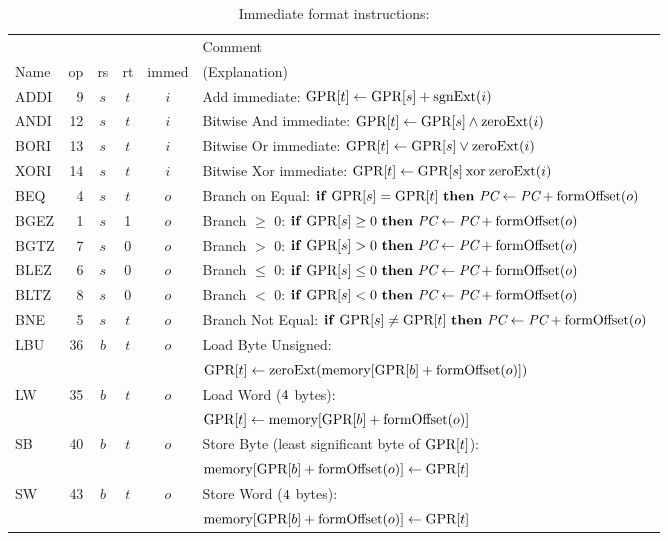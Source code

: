 \documentclass[11pt,letterpaper]{article}
\newcommand{\IFO}[2]{\textrm{\textbf{if} \ensuremath{#1} \textbf{then} \ensuremath{#2} }}
\begin{document}
\begin{table}[htbp]
\caption{Immediate format instructions:}
\label{tab:immedinstrs}  
\begin{tabular}{|l|r|c|c|c|p{11cm}|}
\hline
~    &      & ~  & ~  & ~     & Comment \\
Name & op   & rs & rt & immed & (Explanation) \\
\hline
ADDI  & 9   &$s$ &$t$ & $i$ & Add immediate: $\textrm{GPR[}t\textrm{]} \leftarrow \textrm{GPR[}s\textrm{]} + \textrm{sgnExt}(i)$ \\
\hline
ANDI & 12    &$s$ &$t$ & $i$ & Bitwise And immediate: $\textrm{GPR[}t\textrm{]} \leftarrow \textrm{GPR[}s\textrm{]} \wedge \textrm{zeroExt}(i)$ \\
\hline
BORI & 13    &$s$ &$t$ & $i$ & Bitwise Or immediate: $\textrm{GPR[}t\textrm{]} \leftarrow \textrm{GPR[}s\textrm{]} \vee \textrm{zeroExt}(i)$ \\
\hline
XORI & 14    &$s$ &$t$ & $i$ & Bitwise Xor immediate: $\textrm{GPR[}t\textrm{]} \leftarrow \textrm{GPR[}s\textrm{]} \:\textrm{xor}\: \textrm{zeroExt}(i)$ \\
\hline
BEQ & 4     &$s$ &$t$ & $o$ & Branch on Equal: $\IFO{\GPR{s} = \GPR{t}}{\PC \GETS \PC + \FORMOFFSET{o}}$ \\
\hline
BGEZ & 1    &$s$ & 1  & $o$ & Branch $\geq$ 0: $\IFO{\GPR{s} \geq 0}{\PC \GETS \PC + \FORMOFFSET{o}}$ \\
\hline
BGTZ & 7    &$s$ & 0  & $o$ & Branch $>$ 0: $\IFO{\GPR{s} > 0}{\PC \GETS \PC + \FORMOFFSET{o}}$ \\
\hline
BLEZ & 6    &$s$ & 0  & $o$ & Branch $\leq$ 0: $\IFO{\GPR{s} \leq 0}{\PC \GETS \PC + \FORMOFFSET{o}}$ \\
\hline
BLTZ & 8    &$s$ & 0  & $o$ & Branch $<$ 0: $\IFO{\GPR{s} < 0}{\PC \GETS \PC + \FORMOFFSET{o}}$ \\
\hline
BNE  & 5    &$s$ &$t$ & $o$ & Branch Not Equal: $\IFO{\GPR{s} \neq \GPR{t}}{\PC \GETS \PC + \FORMOFFSET{o}}$ \\
\hline
LBU  & 36   &$b$ &$t$ & $o$ & Load Byte Unsigned: \\
     &      &    &    &     & $\textrm{GPR[}t\textrm{]} \leftarrow \textrm{zeroExt}(\textrm{memory}[\textrm{GPR[}b\textrm{]} + \textrm{formOffset}(o)])$ \\
\hline
LW   & 35   &$b$ &$t$ & $o$ & Load Word ($4$ bytes): \\
     &      &    &    &     & $\textrm{GPR[}t\textrm{]} \leftarrow \textrm{memory}[\textrm{GPR[}b\textrm{]} + \textrm{formOffset}(o)]$ \\
\hline
SB   & 40   &$b$ &$t$ & $o$ & Store Byte (least significant byte of $\textrm{GPR[}t\textrm{]}$): \\
     &      &    &    &     & $\textrm{memory}[\textrm{GPR[}b\textrm{]} + \textrm{formOffset}(o)] \leftarrow \textrm{GPR[}t\textrm{]}$ \\
\hline
SW   & 43   &$b$ &$t$ & $o$ & Store Word ($4$ bytes): \\
     &      &    &    &     & $\textrm{memory}[\textrm{GPR[}b\textrm{]} + \textrm{formOffset}(o)] \leftarrow \textrm{GPR[}t\textrm{]}$ \\
\hline
\end{tabular}
\end{table}
\end{document}
